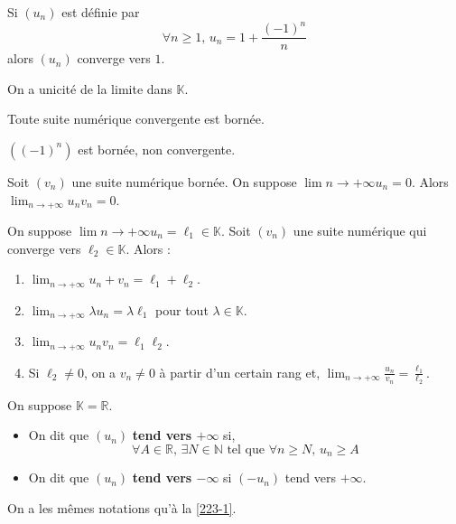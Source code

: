 	\begin{example}
		Si $(u_n)$ est définie par
		\[ \forall n \geq 1, \, u_n = 1 + \frac{(-1)^n}{n} \]
		alors $(u_n)$ converge vers $1$.
	\end{example}
	
	\begin{theorem}
		On a unicité de la limite dans $\mathbb{K}$.
	\end{theorem}
	
	\begin{proposition}
		Toute suite numérique convergente est bornée.
	\end{proposition}
	
	\begin{cexample}
		$((-1)^n)$ est bornée, non convergente.
	\end{cexample}
	
	\begin{proposition}
		Soit $(v_n)$ une suite numérique bornée. On suppose $\lim{n \rightarrow +\infty} u_n = 0$. Alors $\lim_{n \rightarrow +\infty} u_n v_n = 0$.
	\end{proposition}
	
	\begin{proposition}
		On suppose $\lim{n \rightarrow +\infty} u_n = \ell_1 \in \mathbb{K}$. Soit $(v_n)$ une suite numérique qui converge vers $\ell_2 \in \mathbb{K}$. Alors :
		\begin{enumerate}[label=(\roman*)]
			\item $\lim_{n \rightarrow +\infty} u_n + v_n = \ell_1 + \ell_2$.
			\item $\lim_{n \rightarrow +\infty} \lambda u_n = \lambda \ell_1$ pour tout $\lambda \in \mathbb{K}$.
			\item $\lim_{n \rightarrow +\infty} u_n v_n = \ell_1 \ell_2$.
			\item Si $\ell_2 \neq 0$, on a $v_n \neq 0$ à partir d'un certain rang et, $\lim_{n \rightarrow +\infty} \frac{u_n}{v_n} = \frac{\ell_1}{\ell_2}$.
		\end{enumerate}
	\end{proposition}
	
	
	\begin{definition}
		On suppose $\mathbb{K} = \mathbb{R}$.
		\begin{itemize}
			\item On dit que $(u_n)$ \textbf{tend vers $+\infty$} si,
			\[ \forall A \in \mathbb{R}, \, \exists N \in \mathbb{N} \text{ tel que } \forall n \geq N, \, u_n \geq A \]
			\item On dit que $(u_n)$ \textbf{tend vers $-\infty$} si $(-u_n)$ tend vers $+\infty$.
		\end{itemize}
		On a les mêmes notations qu'à la \cref{223-1}.
	\end{definition}
	
